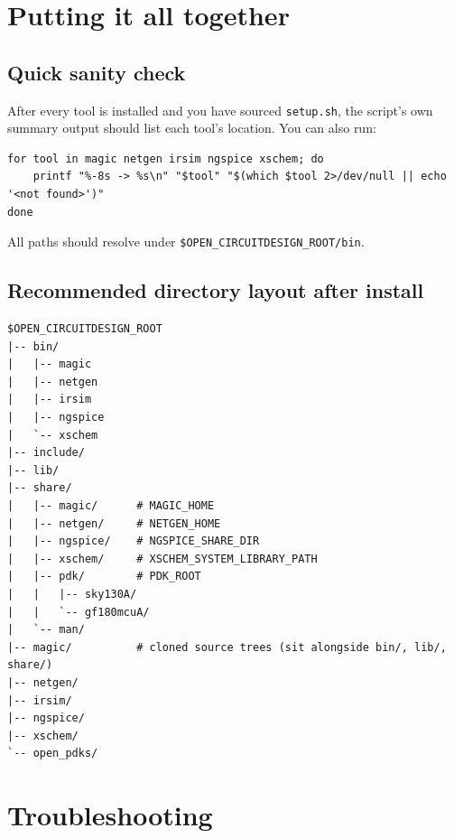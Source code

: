 \documentclass[11pt]{article}
\begin{document}
\section{Putting it all together}

\subsection{Quick sanity check}

After every tool is installed and you have sourced \texttt{setup.sh},
the script's own summary output should list each tool's location. You can
also run:

\begin{lstlisting}
for tool in magic netgen irsim ngspice xschem; do
    printf "%-8s -> %s\n" "$tool" "$(which $tool 2>/dev/null || echo '<not found>')"
done
\end{lstlisting}

All paths should resolve under \texttt{\$OPEN\_CIRCUITDESIGN\_ROOT/bin}.

\subsection{Recommended directory layout after install}

\begin{lstlisting}
$OPEN_CIRCUITDESIGN_ROOT
|-- bin/
|   |-- magic
|   |-- netgen
|   |-- irsim
|   |-- ngspice
|   `-- xschem
|-- include/
|-- lib/
|-- share/
|   |-- magic/      # MAGIC_HOME
|   |-- netgen/     # NETGEN_HOME
|   |-- ngspice/    # NGSPICE_SHARE_DIR
|   |-- xschem/     # XSCHEM_SYSTEM_LIBRARY_PATH
|   |-- pdk/        # PDK_ROOT
|   |   |-- sky130A/
|   |   `-- gf180mcuA/
|   `-- man/
|-- magic/          # cloned source trees (sit alongside bin/, lib/, share/)
|-- netgen/
|-- irsim/
|-- ngspice/
|-- xschem/
`-- open_pdks/
\end{lstlisting}

\section{Troubleshooting}
\label{sec:troubleshooting}
\end{document}
